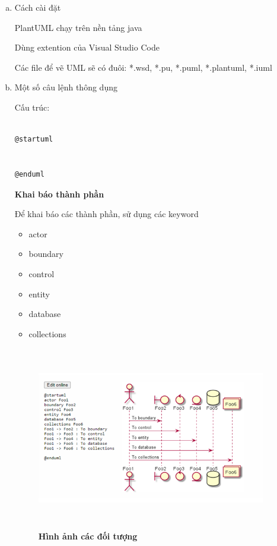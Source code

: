 \begin{enumerate}[a)]
\item Cách cài đặt



PlantUML chạy trên nền tảng java

Dùng extention của Visual Studio Code

Các file để vẽ UML sẽ có đuôi: *.wsd, *.pu, *.puml, *.plantuml, *.iuml


\item  Một số câu lệnh thông dụng


Cấu trúc:

\begin{lstlisting}

@startuml


@enduml

\end{lstlisting}



\textbf{Khai báo thành phần}


Để khai báo các thành phần, sử dụng các keyword

\begin{adjustwidth}{2em}{}
\begin{itemize}
  \item	actor
  \item	boundary
  \item	control
  \item	entity
  \item	database
  \item	collections
  
\end{itemize}
\end{adjustwidth}


\begin{figure}[H]
  \centering
  \includegraphics[width=10cm,height=8cm]{Images/appendix/plantuml_object.png}
  \caption[Hình ảnh các đối tượng]{\bfseries \fontsize{12pt}{0pt}
  \selectfont Hình ảnh các đối tượng}
  \label{plantuml_object} %
\end{figure}



\end{enumerate}
